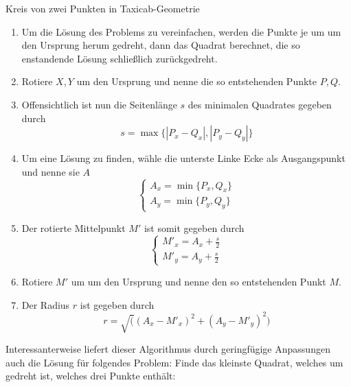 \documentclass{article}
\begin{document}
\begin{algorithm}[H]
    \caption{Kreis von zwei Punkten in Taxicab-Geometrie}
    \BlankLine
    \begin{enumerate}
    \item Um die Lösung des Problems zu vereinfachen, werden die Punkte je um \unit[45]{\textdegree} um den
    Ursprung herum gedreht, dann das Quadrat berechnet, die so enstandende Lösung schließlich zurückgedreht.
    \item Rotiere $X, Y$ \unit[45]{\textdegree} um den Ursprung und nenne die so entstehenden Punkte $P, Q$.
    \item Offensichtlich ist nun die Seitenlänge $s$ des minimalen Quadrates gegeben durch
    \begin{equation}
    s = \max\{|P_x - Q_x|, |P_y - Q_y|\}
    \end{equation}
    \item Um eine Lösung zu finden, wähle die unterste Linke Ecke als Ausgangspunkt und nenne sie $A$
    \begin{equation}
    \begin{cases}
    A_x = \min\{P_x,Q_x\}\\
    A_y = \min\{P_y,Q_y\}
    \end{cases}
    \end{equation}
    \item Der rotierte Mittelpunkt $M'$ ist somit gegeben durch
    \begin{equation}
    \begin{cases}
    M'_x = A_x + \frac{s}{2}\\
    M'_y = A_y + \frac{s}{2}
    \end{cases}
    \end{equation}
    \item Rotiere $M'$ um \unit[45]{\textdegree} um den Ursprung und nenne den so entstehenden Punkt $M$.
    \item Der Radius $r$ ist gegeben durch 
    \begin{equation}
    r = \sqrt( (A_x - M'_x) ^ 2 + (A_y - M'_y) ^ 2 )     
    \end{equation}
    \end{enumerate}
\end{algorithm} 

Interessanterweise liefert dieser Algorithmus durch geringfügige Anpassungen auch die Lösung für folgendes Problem:
Finde das kleinste Quadrat, welches um \unit[45]{\textdegree} gedreht ist, welches drei Punkte enthält:
\end{document}
